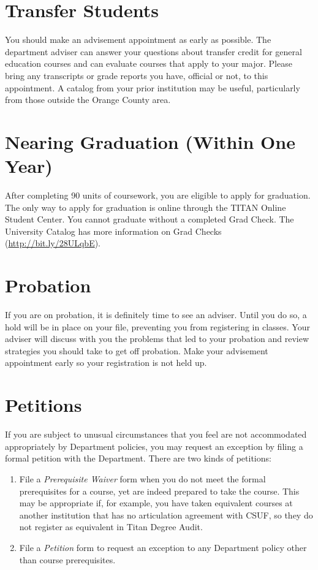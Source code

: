 \documentclass{book}
\newcommand{\CampusName}{CSUF}
\begin{document}
\section{Transfer Students}
You should make an advisement appointment as early as possible. The department adviser can answer your questions about transfer credit for general education courses and can evaluate courses that apply to your major. Please bring any transcripts or grade reports you have, official or not, to this appointment. A catalog from your prior institution may be useful, particularly from those outside the Orange County area.

\section{Nearing Graduation (Within One Year)}
After completing 90 units of coursework, you are eligible to apply for graduation. The only way to apply for graduation is online through the TITAN Online Student Center. You cannot graduate without a completed Grad Check.  The University Catalog has more information on Grad Checks (\url{http://bit.ly/28ULqbE}).

\section{Probation}
If you are on probation, it is definitely time to see an adviser. Until you do so, a hold will be in place on your file, preventing you from registering in classes. Your adviser will discuss with you the problems that led to your probation and review strategies you should take to get off probation. Make your advisement appointment early so your registration is not held up.

\section{Petitions}
\label{section:petitions}


If you are subject to unusual circumstances that you feel are not accommodated appropriately by Department policies, you may request an exception by filing a formal petition with the Department. There are two kinds of petitions:
\begin{enumerate}
\item File a \emph{Prerequisite Waiver} form when you do not meet the formal prerequisites for a course, yet are indeed prepared to take the course. This may be appropriate if, for example, you have taken equivalent courses at another institution that has no articulation agreement with \CampusName, so they do not register as equivalent in Titan Degree Audit.
\item File a \emph{Petition} form to request an exception to any Department policy other than course prerequisites.
\end{enumerate}
\end{document}
